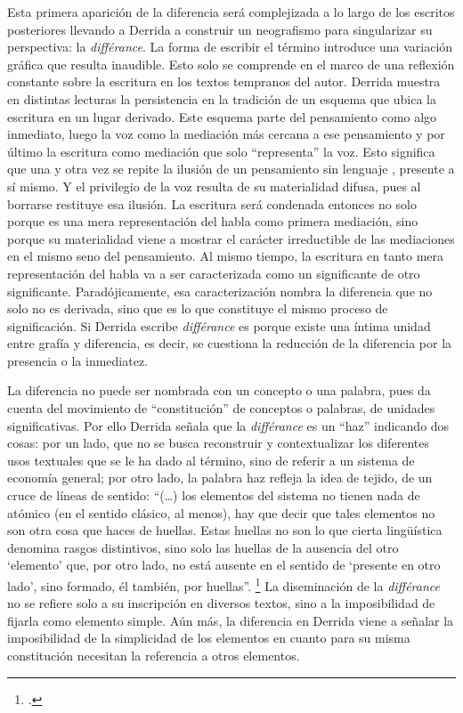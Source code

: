 Esta primera aparición de la diferencia será complejizada a lo largo de los escritos posteriores llevando a Derrida a construir un neografismo para singularizar su perspectiva: la \emph{différance}. La forma de escribir el término introduce una variación gráfica que resulta inaudible. Esto solo se comprende en el marco de una reflexión constante sobre la escritura en los textos tempranos del autor. Derrida muestra en distintas lecturas la persistencia en la tradición de un esquema que ubica la escritura en un lugar derivado. Este esquema parte del pensamiento como algo inmediato, luego la voz como la mediación más cercana a ese pensamiento y por último la escritura como mediación que solo \enquote{representa} la voz. Esto significa que una y otra vez se repite la ilusión de un pensamiento sin lenguaje , presente a sí mismo. Y el privilegio de la voz resulta de su materialidad difusa, pues al borrarse restituye esa ilusión. La escritura será condenada entonces no solo porque es una mera representación del habla como primera mediación, sino porque su materialidad viene a mostrar el carácter irreductible de las mediaciones en el mismo seno del pensamiento. Al mismo tiempo, la escritura en tanto mera representación del habla va a ser caracterizada como un significante de otro significante. Paradójicamente, esa caracterización nombra la diferencia que no solo no es derivada, sino que es lo que constituye el mismo proceso de significación. Si Derrida escribe \emph{différance} es porque existe una íntima unidad entre grafía y diferencia, es decir, se cuestiona la reducción de la diferencia por la presencia o la inmediatez.

La diferencia no puede ser nombrada con un concepto o una palabra, pues da cuenta del movimiento de \enquote{constitución} de conceptos o palabras, de unidades significativas. Por ello Derrida  \linebreak señala que la \emph{différance} es un \enquote{haz} indicando dos cosas: por un lado, que no se busca reconstruir y contextualizar los diferentes usos textuales que se le ha dado al término, sino de referir a un sistema de economía general; por otro lado, la palabra haz refleja la idea de tejido, de un cruce de líneas de sentido: \enquote{(\ldots) los elementos del sistema no tienen nada de atómico (en el sentido clásico, al menos), hay que decir que tales elementos no son otra cosa que haces de huellas. Estas huellas no son lo que cierta lingüística denomina rasgos distintivos, sino solo las huellas de la ausencia del otro \enquote{elemento} que, por otro lado, no está ausente en el sentido de \enquote{presente en otro lado}, sino formado, él también, por huellas}. \footcite[95]{@6982-BENNINGTON1994} La diseminación de la \emph{différance} no se refiere solo a su inscripción en diversos textos, sino a la imposibilidad de fijarla como elemento simple. Aún más, la diferencia en Derrida viene a señalar la imposibilidad de la simplicidad de los elementos en cuanto para su misma constitución necesitan la referencia a otros elementos.


